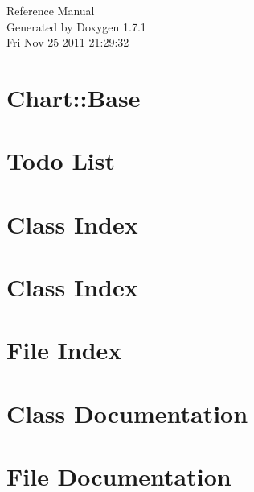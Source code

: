 \documentclass[a4paper]{book}
\begin{document}
\hypersetup{pageanchor=false}
\begin{titlepage}
\vspace*{7cm}
\begin{center}
{\Large Reference Manual}\\
\vspace*{1cm}
{\large Generated by Doxygen 1.7.1}\\
\vspace*{0.5cm}
{\small Fri Nov 25 2011 21:29:32}\\
\end{center}
\end{titlepage}
\clearemptydoublepage
{}
\tableofcontents
\clearemptydoublepage
{}
\hypersetup{pageanchor=true}
\chapter{Chart::Base}
\label{index}\hypertarget{index}{}
\chapter{Todo List}
\label{todo}
\hypertarget{todo}{}

\chapter{Class Index}

\chapter{Class Index}

\chapter{File Index}

\chapter{Class Documentation}
















\chapter{File Documentation}
















\printindex
\end{document}
